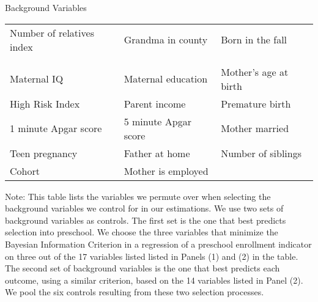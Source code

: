 \begin{threeparttable}
\caption{Background Variables}
\label{tab:pselectvars}
\begin{tabular}{C{5cm} C{5cm} C{5cm}}
\toprule
{} \\
\midrule
Number of relatives index	& Grandma in county	& Born in the fall \\\\
\midrule
{} \\
\midrule
Maternal IQ			& Maternal education		& Mother's age at birth \\
High Risk Index		& Parent income			& Premature birth \\
1 minute Apgar score	& 5 minute Apgar score	& Mother married \\
Teen pregnancy		& Father at home			& Number of siblings \\
Cohort 				& Mother is employed		& \\
\bottomrule
\end{tabular}
\begin{tablenotes}
\footnotesize
\item Note: This table lists the variables we permute over when selecting the background variables we control for in our estimations. We use two sets of background variables as controls. The first set is the one that best predicts selection into preschool. We choose the three variables that minimize the Bayesian Information Criterion in a regression of a preschool enrollment indicator on three out of the 17 variables listed listed in Panels (1) and (2) in the table. The second set of background variables is the one that best predicts each outcome, using a similar criterion, based on the 14 variables listed in Panel (2). We pool the six controls resulting from these two selection processes.
\end{tablenotes}
\end{threeparttable}